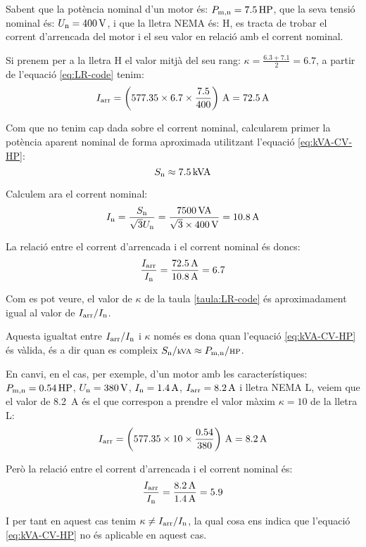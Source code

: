 \begin{exemple}
    Sabent que la  potència nominal d'un motor és: $P_\mathrm{m,n} = \qty{7,5}{HP}$,    que la seva tensió nominal és: $U_\mathrm{n}=\qty{400}{V}$, i que la lletra NEMA és: H, es tracta de trobar el corrent d'arrencada  del  motor i el seu valor en relació amb el corrent nominal.

    Si prenem per a la lletra H el valor mitjà del seu rang: $\kappa = \frac{\num{6,3}+\num{7,1}}{2}=\num{6,7}$, a partir de l'equació  \eqref{eq:LR-code} tenim:
    \[
      I\ped{arr} = \left(\num{577,35} \times \num{6,7} \times \frac{\num{7,5}}{400}\right) \,\unit{A} = \qty{72,5}{A}
    \]

    Com que no tenim cap dada sobre el corrent nominal, calcularem primer la potència aparent nominal de forma aproximada utilitzant l'equació \eqref{eq:kVA-CV-HP}:
    \[
        S_\mathrm{n} \approx \qty{7,5}{kVA}
    \]

    Calculem ara el corrent nominal:
    \[
        I_\mathrm{n}= \frac{S_\mathrm{n}}{\sqrt{3} U_\mathrm{n}} = \frac{\qty{7500}{VA}}{\sqrt{3}\times\qty{400}{V}} = \qty{10,8}{A}
    \]

    La relació entre el corrent d'arrencada i el corrent nominal és doncs:
    \[
        \frac{I_\mathrm{arr}}{I_\mathrm{n}} = \frac{\qty{72,5}{A}}{\qty{10,8}{A}} = \num{6,7}
    \]

    Com es pot veure, el valor  de $\kappa$ de la taula \vref{taula:LR-code} és aproximadament igual al valor de $I_\mathrm{arr}/I_\mathrm{n}$.

    Aquesta igualtat entre $I_\mathrm{arr}/I_\mathrm{n}$ i $\kappa$ només es dona quan l'equació \eqref{eq:kVA-CV-HP} és vàlida, és a dir quan es compleix $S\ped{n}/{\scriptstyle \unit{kVA}} \approx  P\ped{m,n}/{\scriptstyle \unit{HP}}$.

    En canvi, en el cas, per exemple, d'un motor amb les característiques: $P_\mathrm{m,n} = \qty{0,54}{HP}$, $U_\mathrm{n} = \qty{380}{V}$, $I_\mathrm{n} = \qty{1,4}{A}$, $I_\mathrm{arr} = \qty{8,2}{A}$ i lletra NEMA L, veiem que el valor de \qty{8,2}{A} és el que correspon a prendre  el valor màxim $\kappa = 10$ de la lletra L:
    \[
      I\ped{arr} = \left(\num{577,35} \times 10 \times \frac{\num{0,54}}{380}\right) \,\unit{A} = \qty{8,2}{A}
    \]

    Però la relació entre el corrent d'arrencada i el corrent nominal és:
    \[
        \frac{I_\mathrm{arr}}{I_\mathrm{n}} = \frac{\qty{8,2}{A}}{\qty{1,4}{A}} = \num{5,9}
    \]

    I per tant  en aquest cas tenim $\kappa \neq I_\mathrm{arr}/I_\mathrm{n}$, la qual cosa ens indica que l'equació \eqref{eq:kVA-CV-HP} no és aplicable en aquest cas.
\end{exemple}

